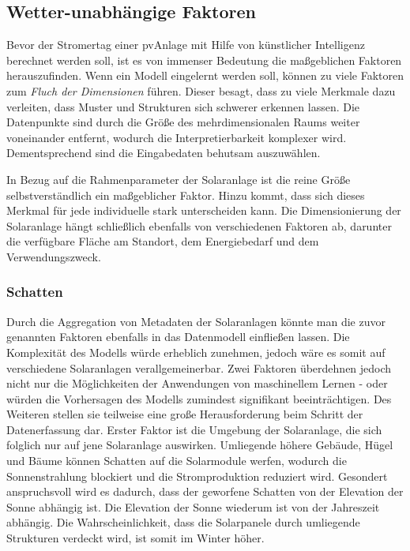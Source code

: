 \documentclass[12pt, a4paper]{article}
\begin{document}

\subsection{Wetter-unabhängige Faktoren}

Bevor der Stromertag einer \ac{pv}Anlage mit Hilfe von künstlicher Intelligenz berechnet werden soll, ist es von immenser Bedeutung die maßgeblichen Faktoren herauszufinden. Wenn ein Modell eingelernt werden soll, können zu viele Faktoren zum \textit{Fluch der Dimensionen} führen. Dieser besagt, dass zu viele Merkmale dazu verleiten, dass Muster und Strukturen sich schwerer erkennen lassen. Die Datenpunkte sind durch die Größe des mehrdimensionalen Raums weiter voneinander entfernt, wodurch die Interpretierbarkeit komplexer wird. Dementsprechend sind die Eingabedaten behutsam auszuwählen.

In Bezug auf die Rahmenparameter der Solaranlage ist die reine Größe selbstverständlich ein maßgeblicher Faktor. Hinzu kommt, dass sich dieses Merkmal für jede individuelle stark unterscheiden kann. Die Dimensionierung der Solaranlage hängt schließlich ebenfalls von verschiedenen Faktoren ab, darunter die verfügbare Fläche am Standort, dem Energiebedarf und dem Verwendungszweck.

\subsubsection{Schatten}

Durch die Aggregation von Metadaten der Solaranlagen könnte man die zuvor genannten Faktoren ebenfalls in das Datenmodell einfließen lassen. Die Komplexität des Modells würde erheblich zunehmen, jedoch wäre es somit auf verschiedene Solaranlagen verallgemeinerbar. Zwei Faktoren überdehnen jedoch nicht nur die Möglichkeiten der Anwendungen von maschinellem Lernen - oder würden die Vorhersagen des Modells zumindest signifikant beeinträchtigen. Des Weiteren stellen sie teilweise eine große Herausforderung beim Schritt der Datenerfassung dar. Erster Faktor ist die Umgebung der Solaranlage, die sich folglich nur auf jene Solaranlage auswirken. Umliegende höhere Gebäude, Hügel und Bäume können Schatten auf die Solarmodule werfen, wodurch die Sonnenstrahlung blockiert und die Stromproduktion reduziert wird. Gesondert anspruchsvoll wird es dadurch, dass der geworfene Schatten von der Elevation der Sonne abhängig ist. Die Elevation der Sonne wiederum ist von der Jahreszeit abhängig. Die Wahrscheinlichkeit, dass die Solarpanele durch umliegende Strukturen verdeckt wird, ist somit im Winter höher. 
\end{document}
